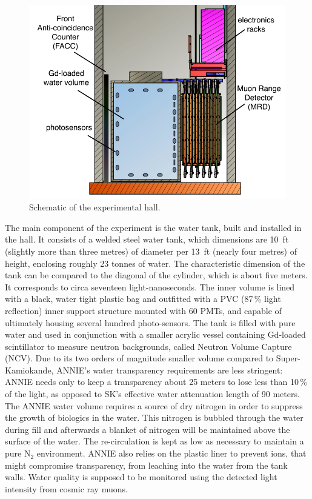  \begin{figure}
   \centering
   \includegraphics[scale=0.25]{pics/ANNIEreduced2}
   \caption{Schematic of the experimental hall.}
   \label{fig:anniehall}
 \end{figure}
 
 The main component of the experiment is the water tank, built and installed in the hall.
 It consists of a welded steel water tank, which dimensions are 10~ft (slightly more than three metres) %
 of diameter per 13~ft (nearly four metres) of height, enclosing roughly 23 tonnes of water.
 The characteristic dimension of the tank can be compared to the diagonal of the cylinder, %
 which is about five meters.
 It corresponds to circa seventeen light-nanoseconds.
 The inner volume is lined with a black, water tight plastic bag and outfitted with %
 a PVC (87\,\% light reflection) inner support structure mounted with 60 PMTs, and capable of %
 ultimately housing several hundred photo-sensors. 
 The tank is filled with pure water and used in conjunction with a smaller %
 acrylic vessel containing Gd-loaded scintillator to measure neutron backgrounds, called %
 Neutron Volume Capture (NCV).
 Due to its two orders of magnitude smaller volume compared to Super-Kamiokande, %
 ANNIE’s water transparency requirements are less stringent: %
 ANNIE needs only to keep a transparency about 25 meters to lose less than 10\,\% of the light, %
 as opposed to SK’s effective water attenuation length of 90 meters.
 The ANNIE water volume requires a source of dry nitrogen in order to suppress the growth of %
 biologics in the water.
 This nitrogen is bubbled through the water during fill and afterwards a blanket of nitrogen %
 will be maintained above the surface of the water. 
 The re-circulation is kept as low as necessary to maintain a pure N$_2$ environment.
 ANNIE also relies on the plastic liner to prevent ions, that might compromise transparency, %
 from leaching into the water from the tank walls.
 Water quality is supposed to be monitored using the detected light intensity from cosmic ray muons.
 
